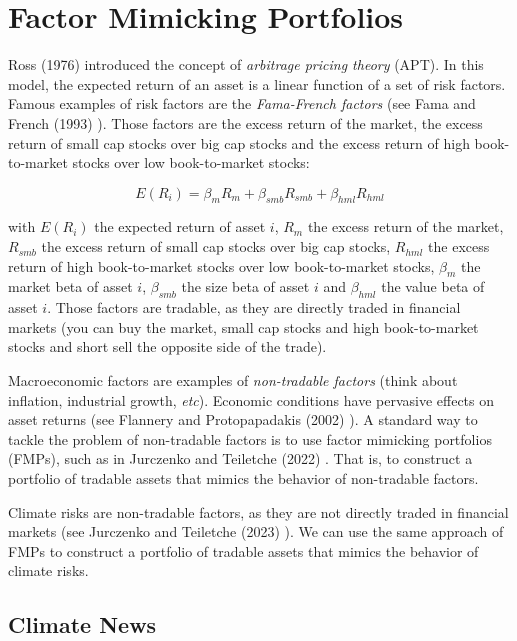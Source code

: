 \chapter{Factor Mimicking Portfolios}


Ross (1976) \cite{ross1976apt} introduced 
the concept of \textit{arbitrage pricing theory} (APT).
In this model, the expected return of an asset is
a linear function of a set of risk factors. Famous examples of risk factors are the
\textit{Fama-French factors} (see Fama and French (1993) \cite{fama1993common}).
Those factors are the excess return of the market,
the excess return of small cap stocks over big cap stocks
and the excess return of high book-to-market stocks over low book-to-market stocks:

\begin{equation}
    E(R_i) = \beta_m R_m + \beta_{smb} R_{smb} + \beta_{hml} R_{hml}
\end{equation}

with $E(R_i)$ the expected return of asset $i$,
$R_m$ the excess return of the market, $R_{smb}$ the excess return of small cap stocks over big cap stocks,
$R_{hml}$ the excess return of high book-to-market stocks over low book-to-market stocks,
$\beta_m$ the market beta of asset $i$, $\beta_{smb}$ the size beta of asset $i$ and $\beta_{hml}$ the value beta of asset $i$.
Those factors are tradable, as 
they are directly traded in financial markets (you can buy 
the market, small cap stocks and high book-to-market stocks
and short sell the opposite side of the trade).

Macroeconomic factors are examples of 
\textit{non-tradable factors} (think about inflation, 
industrial growth, \textit{etc}). Economic conditions 
have pervasive effects on asset returns (see Flannery 
and Protopapadakis (2002) \cite{flannery2002macroeconomic}).
A standard way to tackle the problem of non-tradable factors
is to use factor mimicking portfolios (FMPs), such 
as in Jurczenko and Teiletche (2022) \cite{jurczenko2022macro}. That is,
to construct a portfolio of tradable assets that
mimics the behavior of non-tradable factors. 


Climate risks are non-tradable factors,
as they are not directly traded in financial markets
(see Jurczenko and Teiletche (2023) \cite{jurczenko2023climate}).
We can use the same approach of FMPs to construct
a portfolio of tradable assets that mimics the behavior
of climate risks.

\section{Climate News}


